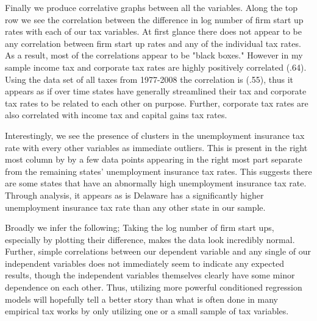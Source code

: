 Finally we produce correlative graphs between all the variables. Along the top row we see the correlation between the difference in log number of firm start up rates with each of our tax variables. At first glance there does not appear to be any correlation between firm start up rates and any of the individual tax rates. As a result, most of the correlations appear to be "black boxes." However in my sample income tax and corporate tax rates are highly positively correlated (.64). Using the data set of all taxes from 1977-2008 the correlation is (.55), thus it appears as if over time states have generally streamlined their tax and corporate tax rates to be related to each other on purpose. Further, corporate tax rates are also correlated with income tax and capital gains tax rates. 

Interestingly, we see the presence of  clusters in the unemployment insurance tax rate with every other variables as immediate outliers. This is present in the right most column by by a few data points appearing in the right most part separate from the remaining states' unemployment insurance tax rates. This suggests there are some states that have an abnormally high unemployment insurance tax rate. Through analysis, it appears as is Delaware has a significantly higher unemployment insurance tax rate than any other state in our sample.

Broadly we infer the following; Taking the log number of firm start ups, especially by plotting their difference, makes the data look incredibly normal. Further, simple correlations between our dependent variable and any single of our independent variables does not immediately seem to indicate any expected results, though the independent variables themselves clearly have some minor dependence on each other. Thus, utilizing more powerful conditioned regression models will hopefully tell a better story than what is often done in many empirical tax works by only utilizing one or a small sample of tax variables.